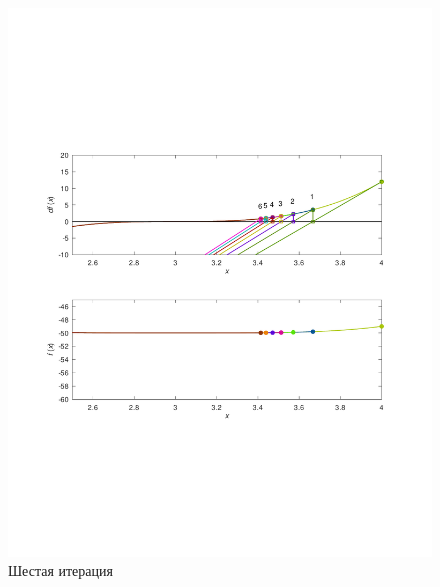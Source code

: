 \documentclass[a4paper,12pt]{article}
\begin{document}
    \begin{figure}[H]
        \centering
        \includegraphics[scale=0.4]{6secantitter.pdf}
        \caption{Шестая итерация}
    \end{figure}
\end{document}
